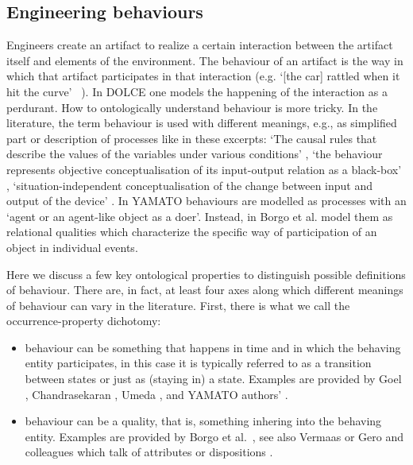 \documentclass[sw]{iosart2x}
\newcommand{\DOLCE}{\textsc{DOLCE}\xspace} %
\newcommand{\YAMATO}{\textsc{YAMATO}\xspace}
\newcommand{\quotes}[1]{`#1'}
\begin{document}
\subsection{Engineering behaviours}
Engineers create an artifact to realize a certain interaction between the artifact itself and elements of the environment. The behaviour of an artifact is the way in which that artifact participates in that interaction (e.g. \quotes{[the car] rattled when it hit the curve} ~\cite{chandrasekaranFunctionDeviceRepresentation2000}). 
In \DOLCE one models the happening of the interaction as a perdurant. How to ontologically understand behaviour is more tricky. 
In the literature, the term behaviour is used with different meanings, e.g., as simplified part or description of processes like in these excerpts: \quotes{The causal rules that describe the values of the variables under various conditions} \cite{chandrasekaranFunctionDeviceRepresentation2000}, \quotes{the behaviour represents objective conceptualisation of its input-output relation as a black-box} \cite{kitamuraOntologicalModelDevice2006}, \quotes{situation-independent conceptualisation of the change between input and output of the device} \cite{mizoguchiFunctionalOntologyArtifacts2009}. 
In \YAMATO \cite{Mizoguchi2017YAMATOYA} behaviours are modelled as processes with an \quotes{agent or an agent-like object as a doer}. 
Instead, in \cite{borgoFormalOntologicalPerspective2009} Borgo et al.  model them as relational qualities which characterize the specific way of participation of an object in individual events. 




  






Here we discuss a few key ontological properties to distinguish possible definitions of behaviour.
There are, in fact, at least four axes along which different meanings of behaviour can vary in the literature.
First, there is what we call the occurrence-property dichotomy:
\begin{itemize}
  \item behaviour can be something that happens in time  and in which the behaving entity participates, 
  in this case it is typically referred to as a transition between states or just as (staying in) a state. 
  Examples are provided by Goel \cite{goelStructureBehaviorFunction2009}, Chandrasekaran \cite{chandrasekaranFunctionDeviceRepresentation2000}, Umeda \cite{umedaFunctionBehaviourStructure1990}, and \YAMATO authors' \cite{mizoguchiFunctionalOntologyArtifacts2009}.
  \item behaviour can  be a quality, that is, something inhering into the behaving entity. 
   Examples are provided by Borgo et al.~\cite{borgoFormalOntologicalPerspective2009}, see also Vermaas or Gero and colleagues which talk of attributes or dispositions \cite{vermaasConceptualFrameworkJohn2007,geroCategorisingTechnologicalKnowledge2002}.
\end{itemize} 
\end{document}
